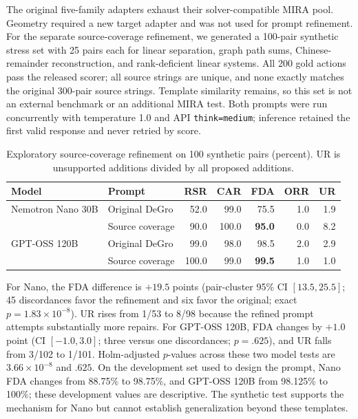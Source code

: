 \documentclass[10pt]{article}
\newcommand{\code}[1]{{\footnotesize\nolinkurl{#1}}}
\begin{document}
The original five-family adapters exhaust their solver-compatible MIRA pool. Geometry required a new target adapter and was not used for prompt refinement. For the separate source-coverage refinement, we generated a 100-pair synthetic stress set with 25 pairs each for linear separation, graph path sums, Chinese-remainder reconstruction, and rank-deficient linear systems. All 200 gold actions pass the released scorer; all source strings are unique, and none exactly matches the original 300-pair source strings. Template similarity remains, so this set is not an external benchmark or an additional MIRA test. Both prompts were run concurrently with temperature 1.0 and API \code{think=medium}; inference retained the first valid response and never retried by score.

\begin{table}[H]
\centering
\caption{Exploratory source-coverage refinement on 100 synthetic pairs (percent). UR is unsupported additions divided by all proposed additions.}
\begin{tabular}{@{}llrrrrr@{}}
\toprule
Model & Prompt & RSR & CAR & FDA & ORR & UR\\
\midrule
Nemotron Nano 30B & Original DeGro & 52.0 & 99.0 & 75.5 & 1.0 & 1.9\\
 & Source coverage & 90.0 & 100.0 & \textbf{95.0} & 0.0 & 8.2\\
\midrule
GPT-OSS 120B & Original DeGro & 99.0 & 98.0 & 98.5 & 2.0 & 2.9\\
 & Source coverage & 100.0 & 99.0 & \textbf{99.5} & 1.0 & 1.0\\
\bottomrule
\end{tabular}
\end{table}

For Nano, the FDA difference is $+19.5$ points (pair-cluster 95\% CI $[13.5,25.5]$; 45 discordances favor the refinement and six favor the original; exact $p=1.83\times10^{-8}$). UR rises from 1/53 to 8/98 because the refined prompt attempts substantially more repairs. For GPT-OSS 120B, FDA changes by $+1.0$ point (CI $[-1.0,3.0]$; three versus one discordances; $p=.625$), and UR falls from 3/102 to 1/101. Holm-adjusted $p$-values across these two model tests are $3.66\times10^{-8}$ and $.625$. On the development set used to design the prompt, Nano FDA changes from 88.75\% to 98.75\%, and GPT-OSS 120B from 98.125\% to 100\%; these development values are descriptive. The synthetic test supports the mechanism for Nano but cannot establish generalization beyond these templates.
\end{document}

